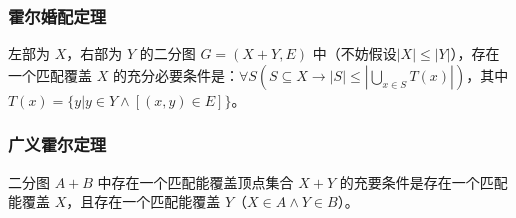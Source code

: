 \subsubsection{霍尔婚配定理}

左部为 $X$，右部为 $Y$ 的二分图 $G=(X+Y,E)$ 中（不妨假设$|X|\le|Y|$），存在一个匹配覆盖 $X$ 的充分必要条件是：$\displaystyle\forall S(S\subseteq X \to\left|S\right|\le\left|\bigcup\limits_{x\in S}T(x)\right|)$，其中 $T(x)=\{y|y\in Y\land\left[(x,y)\in E\right]\}$。

\subsubsection{广义霍尔定理}

二分图 $A+B$ 中存在一个匹配能覆盖顶点集合 $X+Y$ 的充要条件是存在一个匹配能覆盖 $X$，且存在一个匹配能覆盖 $Y$（$X\in A\land Y\in B$）。
